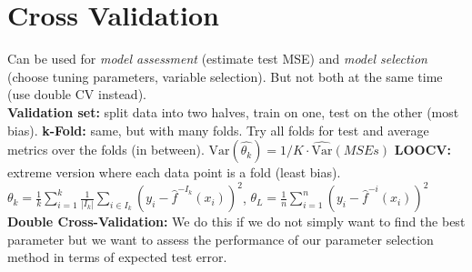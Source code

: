 \section*{Cross Validation}
Can be used for \textit{model assessment} (estimate test MSE) and \textit{model selection} (choose tuning parameters, variable selection). But not both at the same time (use double CV instead). \\
\textbf{Validation set:} split data into two halves, train on one, test on the other (most bias).
\textbf{k-Fold:} same, but with many folds. Try all folds for test and average metrics over the folds (in between). $\text{Var}(\hat {\theta_k}) = 1/K \cdot \hat {\text{Var}}(MSEs)$ \textbf{LOOCV:} extreme version where each data point is a fold (least bias). \\
$\theta_k = \frac 1 k \sum_{i=1}^k \frac 1 {|I_k|} \sum_{i\in I_k} (y_i - \hat f^{-I_k}(x_i))^2$, 
$\theta_{L} = \frac 1 n \sum_{i=1}^n (y_i - \hat f^{-i}(x_i))^2$
\textbf{Double Cross-Validation:} We do this if we do not simply want to find the best parameter but we want to assess the performance of our parameter selection method in terms of expected test error.
